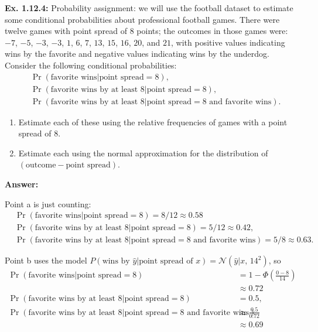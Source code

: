 \documentclass{article}
\newcommand\oname\operatorname
\begin{document}
\textbf{Ex. 1.12.4: }Probability assignment: we will use the football dataset to estimate some conditional probabilities about professional football games. There were twelve games with point spread of $8$ points; the outcomes in those games were: $-7$, $-5$, $-3$, $-3$, $1$, $6$, $7$, $13$, $15$, $16$, $20$, and $21$, with positive values indicating wins by the favorite and negative values indicating wins by the underdog. Consider the following conditional probabilities:
\begin{align*}
	&\oname{Pr}(\text{favorite wins}|\text{point spread}=8),\\
	&\oname{Pr}(\text{favorite wins by at least $8$}|\text{point spread}=8),\\
	&\oname{Pr}(\text{favorite wins by at least $8$}|\text{point spread}=8\text{ and favorite wins}).
\end{align*}
\begin{enumerate}[label=\alph*]
	\item Estimate each of these using the relative frequencies of games with a point spread of $8$.
	\item Estimate each using the normal approximation for the distribution of $(\text{outcome}-\text{point spread})$.
\end{enumerate}

\textbf{Answer: }

Point a is just counting:
\begin{align*}
	&\oname{Pr}(\text{favorite wins}|\text{point spread}=8)=8/12\approx0.58\\
	&\oname{Pr}(\text{favorite wins by at least $8$}|\text{point spread}=8)=5/12\approx0.42,\\
	&\oname{Pr}(\text{favorite wins by at least $8$}|\text{point spread}=8\text{ and favorite wins})=5/8\approx0.63.
\end{align*}

Point b uses the model $P(\text{wins by $\hat{y}$}|\text{point spread of $x$})=\mathcal N(\hat{y}|x,\,14^2)$, so
\begin{align*}
	\oname{Pr}(\text{favorite wins}|\text{point spread}=8)&=1-\Phi\left(\frac{0-8}{14}\right)\\
	&\approx0.72\\
	\oname{Pr}(\text{favorite wins by at least $8$}|\text{point spread}=8)&=0.5,\\
	\oname{Pr}(\text{favorite wins by at least $8$}|\text{point spread}=8\text{ and favorite wins})&\approx\frac{0.5}{0.72}\\
	&\approx0.69
\end{align*}
\end{document}

